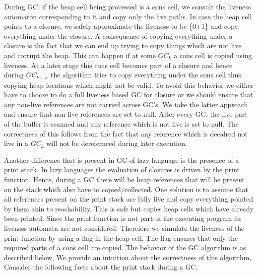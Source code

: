 \documentclass[9pt]{sigplanconf}
\newcommand{\comment}[1]{{\color{Myblue}{(#1)}}}
\begin{document}
\begin{enumerate}

\comment{Mention the fact that liveness at a program point indicates
  what references will be used by the program eventually. The exact
  point where a reference will be used cannot be determined statically
due to the language being lazy. }
During GC, if the heap cell being processed is a cons cell, we consult
the  liveness automaton  corresponding to  it and  copy only  the live
paths.  In  case  the  heap  cell  points  to  a  closure,  we  safely
approximate the  liveness to be {\{0+1\}\*} and  copy everything under
the closure.
A consequence of  copying everything under a closure  is the fact that
we can end up trying to copy things which are not live and corrupt the
heap. This  can happen if at some  $GC_k$ a cons cell  is copied using
liveness. At  a later stage this  cons cell becomes part  of a closure
and  hence during $GC_{k+n}$  the algorithm  tries to  copy everything
under the  cons cell  thus copying heap  locations which might  not be
valid.  To avoid  this behavior we either have to choose  to do a full
liveness based  GC for closure or  we should ensure  that any non-live
references are  not carried across  GC's. We take the  latter approach
and ensure that  non-live references are set to  null. After every GC,
the live part of the buffer  is scanned and any reference which is not
live is  set to null.  The correctness of  this follows from  the fact
that any reference which is decalred  not live in a $GC_k$ will not be
derefernced during later execution.


Another  difference that is  present in  GC of  lazy language  is the
presence  of  a print  stack.  In  lazy  languages the  evaluation  of
closures is  driven by the print  function\comment{Refer to SPJ's book}.  Hence, during  a GC there
will be heap  references that will be present on  the stack which also
have  to  copied/collected.   One  solution  is  to  assume  that  all
references  present  on  the  print  stack are  fully  live  and  copy
everything pointed  by them  akin to reachability.   This is  safe but
copies heap  cells which  have already been  printed. Since  the print
function is  not part of  the executing program its  liveness automata
are not  considered. Therefore we  simulate the liveness of  the print
function by using a flag in  the heap cell. The flag ensures that only
the required parts  of a cons cell are copied. The  behavior of the GC
algorithm is as described below,
We   provide   an   intuition    about   the   correctness   of   this
algorithm. Consider the following facts about the print stack during a
GC, 


\end{enumerate}
\end{document}
